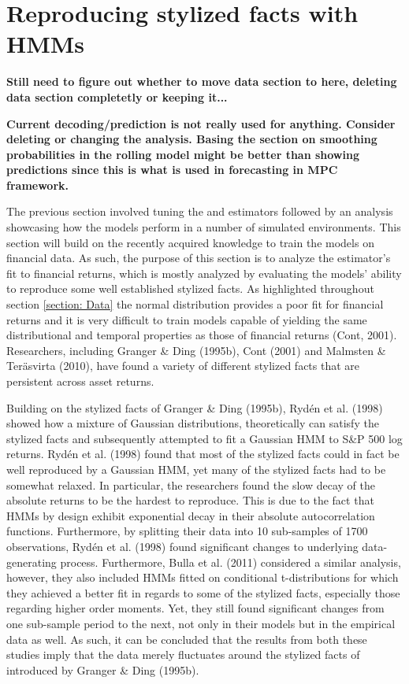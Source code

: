 \newpage

\section{Reproducing stylized facts with HMMs}
\label{Section: Stylized facts}

\textbf{Still need to figure out whether to move data section to here, deleting data section completetly or keeping it...}

\textbf{Current decoding/prediction is not really used for anything. Consider deleting or changing the analysis. Basing the section on smoothing probabilities in the rolling model might be better than showing predictions since this is what is used in forecasting in MPC framework.}

The previous section involved tuning the \jump and \mle estimators followed by an analysis showcasing how the models perform in a number of simulated environments. This section will build on the recently acquired knowledge to train the models on financial data. As such, the purpose of this section is to analyze the estimator's fit to financial returns, which is mostly analyzed by evaluating the models' ability to reproduce some well established stylized facts. As highlighted throughout section \ref{section: Data} the normal distribution provides a poor fit for financial returns and it is very difficult to train models capable of yielding the same distributional and temporal properties as those of financial returns (Cont, 2001). Researchers, including Granger \& Ding (1995b), Cont (2001) and Malmsten \& Teräsvirta (2010), have found a variety of different stylized facts that are persistent across asset returns. 

Building on the stylized facts of Granger \& Ding (1995b), Rydén et al. (1998) showed how a mixture of Gaussian distributions, theoretically can satisfy the stylized facts and subsequently attempted to fit a Gaussian HMM to S\&P 500 log returns. Rydén et al. (1998) found that most of the stylized facts could in fact be well reproduced by a Gaussian HMM, yet many of the stylized facts had to be somewhat relaxed. In particular, the researchers found the slow decay of the absolute returns to be the hardest to reproduce. This is due to the fact that HMMs by design exhibit exponential decay in their absolute autocorrelation functions. Furthermore, by splitting their data into 10 sub-samples of 1700 observations, Rydén et al. (1998) found significant changes to underlying data-generating process. Furthermore, Bulla et al. (2011) considered a similar analysis, however, they also included HMMs fitted on conditional t-distributions for which they achieved a better fit in regards to some of the stylized facts, especially those regarding higher order moments. Yet, they still found significant changes from one sub-sample period to the next, not only in their models but in the empirical data as well. As such, it can be concluded that the results from both these studies imply that the data merely fluctuates around the stylized facts of introduced by Granger \& Ding (1995b).

